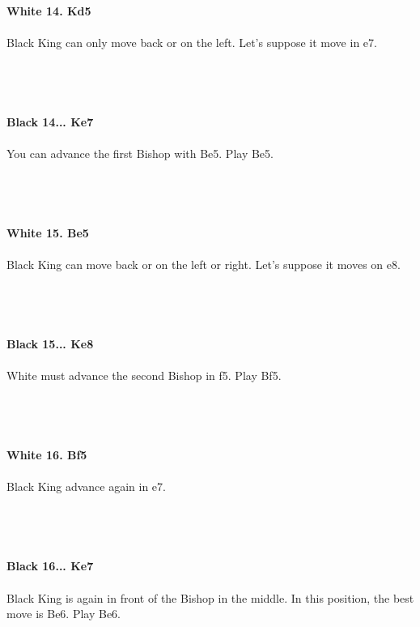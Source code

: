 \documentclass{article}
\begin{document}
\\
\textbf{White 14. Kd5}\\
\\
Black King can only move back or on the left. Let's suppose it move in e7.\\\\
\\

\\
\\
\textbf{Black 14... Ke7}\\
\\
You can advance the first Bishop with Be5. Play Be5.\\\\
\\

\\
\\
\textbf{White 15. Be5}\\
\\
Black King can move back or on the left or right. Let's suppose it moves on e8.\\\\
\\

\\
\\
\textbf{Black 15... Ke8}\\
\\
White must advance the second Bishop in f5. Play Bf5.\\\\
\\

\\
\\
\textbf{White 16. Bf5}\\
\\
Black King advance again in e7.\\\\
\\

\\
\\
\textbf{Black 16... Ke7}\\
\\
Black King is again in front of the Bishop in the middle. In this position, the best move is Be6. Play Be6.\\\\
\end{document}
